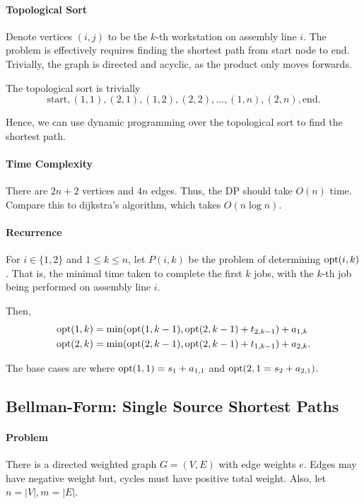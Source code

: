 \paragraph{Topological Sort}
Denote vertices \(\left( i, j \right) \) to be the \(k\)-th workstation on assembly
line  \(i\). The problem is effectively requires finding the shortest path
from start node to end.
Trivially, the graph is directed and acyclic, as the product only moves
forwards.

The topological sort is trivially \[
  \text{start}, (1, 1), (2, 1), (1, 2), (2, 2), \ldots, (1, n), (2, n), \text{end}
.\] 

Hence, we can use dynamic programming over the topological sort to
find the shortest path.

\paragraph{Time Complexity}
There are \(2n + 2\) vertices and  \(4n\) edges. Thus, the  DP should
take \(O(n)\) time. Compare this to dijkstra's algorithm, which takes
\(O(n \log n)\).

\paragraph{Recurrence}
For \(i \in \{1, 2\} \) and \(1 \leq k \leq n\), let  \(P(i, k)\)
be the problem of determining  \(\mathrm{opt}(i, k)\). That is, the minimal time taken to complete
the first  \(k\) jobs, with the  \(k\)-th job being performed on assembly line \(i\).

Then,
\begin{align*}
  \mathrm{opt}(1, k) &= \min( \mathrm{opt}(1, k - 1), \mathrm{opt}(2, k -1) + t_{2, k - 1} )  + a_{1, k} \\
  \mathrm{opt}(2, k) &= \min( \mathrm{opt}(2, k - 1), \mathrm{opt}(2, k -1) + t_{1, k - 1} )  + a_{2, k}
.\end{align*}

The base cases are where \(\mathrm{opt}(1, 1) = s_1 + a_{1, 1}\) and \(\mathrm{opt}(2, 1 = s_{2} + a_{2, 1})\).

\subsection{Bellman-Form: Single Source Shortest Paths}

\paragraph{Problem}
There is a directed weighted graph \(G = (V, E)\) with edge weights  \(e\).
Edges may have negative weight but, cycles must have positive total weight.
Also, let  \(n = |V|, m = |E|\).

